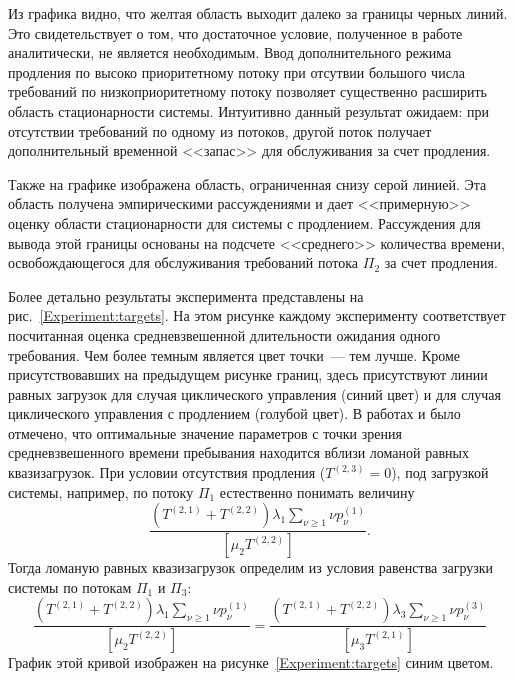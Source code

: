 \documentclass[11pt]{ubs}
\begin{document}
Из графика видно, что желтая область выходит далеко за границы черных линий. Это свидетельствует о том, что достаточное условие, полученное в работе аналитически, не является необходимым. Ввод дополнительного режима продления по высоко приоритетному потоку при отсутвии большого числа требований по низкоприоритетному потоку позволяет существенно расширить область стационарности системы. Интуитивно данный результат ожидаем: при отсутствии требований по одному из потоков, другой поток получает дополнительный временной <<запас>> для обслуживания за счет продления.

Также на графике изображена область, ограниченная снизу серой линией. Эта область получена эмпирическими рассуждениями и дает <<примерную>> оценку области стационарности для системы с продлением. Рассуждения для вывода этой границы основаны на подсчете <<среднего>> количества времени, освобождающегося для обслуживания требований потока $\Pi_2$ за счет продления.



Более детально результаты эксперимента представлены на рис.~\ref{Experiment:targets}. На этом рисунке каждому эксперименту соответствует посчитанная оценка средневзвешенной длительности ожидания одного требования. Чем более темным является цвет точки~--- тем лучше. Кроме присутствовавших на предыдущем рисунке границ, здесь присутствуют линии равных загрузок для случая циклического управления (синий цвет) и для случая циклического управления с продлением (голубой цвет). В работах \cite{Fedotkin:A:2009} и \cite{Fedotkin:Rachinskaya:2016} было отмечено, что оптимальные значение параметров с точки зрения средневзвешенного времени пребывания находится вблизи ломаной равных квазизагрузок. При условии отсутствия продления ($T^{(2,3)}=0$),  под загрузкой системы, например, по потоку $\Pi_1$ естественно понимать величину
\begin{equation}
\frac{(T^{(2,1)} + T^{(2,2)})\lambda_1 \sum_{\nu\geqslant 1}\nu p_{\nu}^{(1)}}{[\mu_2 T^{(2,2)}]}.
\end{equation}
Тогда ломаную равных квазизагрузок определим из условия равенства загрузки системы по потокам $\Pi_1$ и $\Pi_3$:
\begin{equation}
\frac{(T^{(2,1)} + T^{(2,2)})\lambda_1 \sum_{\nu\geqslant 1}\nu p_{\nu}^{(1)}}{[\mu_2 T^{(2,2)}]}=
    \frac{(T^{(2,1)} + T^{(2,2)})\lambda_3 \sum_{\nu\geqslant 1}\nu p_{\nu}^{(3)}}{[\mu_3 T^{(2,1)}]}
\end{equation}
График этой кривой изображен на рисунке~\ref{Experiment:targets} синим цветом. 
\end{document}
